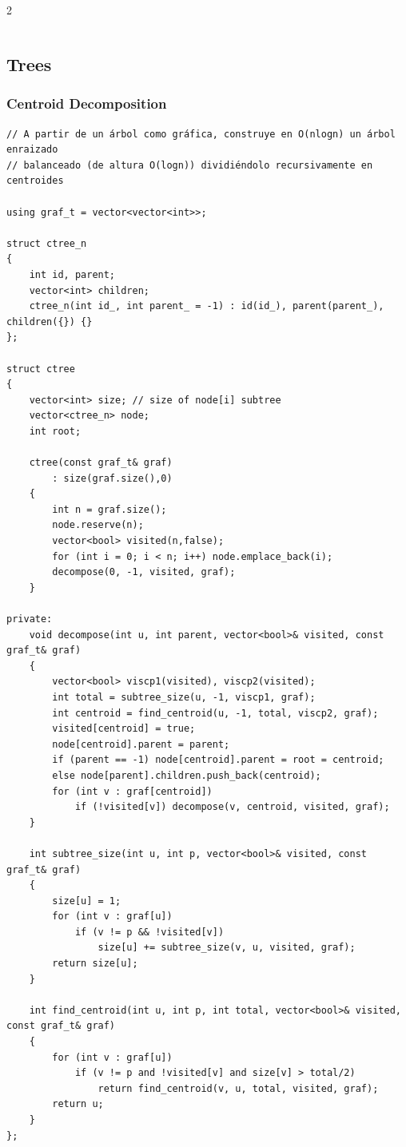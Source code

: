 \documentclass[twoside]{article}
\begin{document}
\begin{multicols*}{2}
\begin{verbatim}
\end{verbatim}

	{
		\subsection*{Trees}
	}
	{
		\subsubsection*{Centroid Decomposition}
	}
	\begin{verbatim}
// A partir de un árbol como gráfica, construye en O(nlogn) un árbol enraizado
// balanceado (de altura O(logn)) dividiéndolo recursivamente en centroides

using graf_t = vector<vector<int>>;

struct ctree_n
{
    int id, parent;
    vector<int> children;
    ctree_n(int id_, int parent_ = -1) : id(id_), parent(parent_), children({}) {}
};

struct ctree
{
    vector<int> size; // size of node[i] subtree
    vector<ctree_n> node;
    int root;

    ctree(const graf_t& graf)
        : size(graf.size(),0)
    {
        int n = graf.size();
        node.reserve(n);
        vector<bool> visited(n,false);
        for (int i = 0; i < n; i++) node.emplace_back(i);
        decompose(0, -1, visited, graf);
    }

private:
    void decompose(int u, int parent, vector<bool>& visited, const graf_t& graf)
    {
        vector<bool> viscp1(visited), viscp2(visited);
        int total = subtree_size(u, -1, viscp1, graf);
        int centroid = find_centroid(u, -1, total, viscp2, graf);
        visited[centroid] = true;
        node[centroid].parent = parent;
        if (parent == -1) node[centroid].parent = root = centroid;
        else node[parent].children.push_back(centroid);
        for (int v : graf[centroid])
            if (!visited[v]) decompose(v, centroid, visited, graf);
    }

    int subtree_size(int u, int p, vector<bool>& visited, const graf_t& graf)
    {
        size[u] = 1;
        for (int v : graf[u])
            if (v != p && !visited[v])
                size[u] += subtree_size(v, u, visited, graf);
        return size[u];
    }

    int find_centroid(int u, int p, int total, vector<bool>& visited, const graf_t& graf)
    {
        for (int v : graf[u])
            if (v != p and !visited[v] and size[v] > total/2)
                return find_centroid(v, u, total, visited, graf);
        return u;
    }
};


\end{verbatim}
\end{multicols*}
\end{document}
